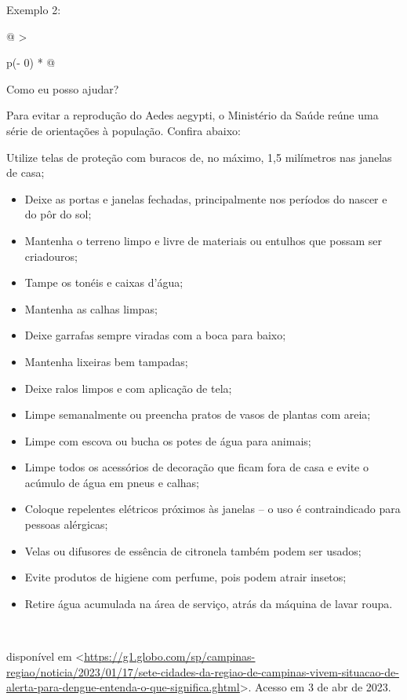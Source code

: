 Exemplo 2:

\begin{longtable}[]{@{}
  >{\raggedright\arraybackslash}p{(\columnwidth - 0\tabcolsep) * }@{}}
\toprule
\endhead
\begin{minipage}[t]{\linewidth}\raggedright
Como eu posso ajudar?

Para evitar a reprodução do Aedes aegypti, o Ministério da Saúde reúne
uma série de orientações à população. Confira abaixo:

Utilize telas de proteção com buracos de, no máximo, 1,5 milímetros nas
janelas de casa;

\begin{itemize}
\item
  Deixe as portas e janelas fechadas, principalmente nos períodos do
  nascer e do pôr do sol;
\item
  Mantenha o terreno limpo e livre de materiais ou entulhos que possam
  ser criadouros;
\item
  Tampe os tonéis e caixas d'água;
\item
  Mantenha as calhas limpas;
\item
  Deixe garrafas sempre viradas com a boca para baixo;
\item
  Mantenha lixeiras bem tampadas;
\item
  Deixe ralos limpos e com aplicação de tela;
\item
  Limpe semanalmente ou preencha pratos de vasos de plantas com areia;
\item
  Limpe com escova ou bucha os potes de água para animais;
\item
  Limpe todos os acessórios de decoração que ficam fora de casa e evite
  o acúmulo de água em pneus e calhas;
\item
  Coloque repelentes elétricos próximos às janelas -- o uso é
  contraindicado para pessoas alérgicas;
\item
  Velas ou difusores de essência de citronela também podem ser usados;
\item
  Evite produtos de higiene com perfume, pois podem atrair insetos;
\item
  Retire água acumulada na área de serviço, atrás da máquina de lavar
  roupa.
\end{itemize}
\end{minipage} \\
\bottomrule
\end{longtable}

disponível em
\textless{}\href{https://g1.globo.com/sp/campinas-regiao/noticia/2023/01/17/sete-cidades-da-regiao-de-campinas-vivem-situacao-de-alerta-para-dengue-entenda-o-que-significa.ghtml}{\uline{https://g1.globo.com/sp/campinas-regiao/noticia/2023/01/17/sete-cidades-da-regiao-de-campinas-vivem-situacao-de-alerta-para-dengue-entenda-o-que-significa.ghtml}}\textgreater.
Acesso em 3 de abr de 2023.

